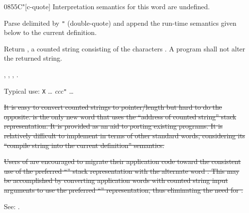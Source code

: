 \begin{worddef}[Cq]{0855}{C"}[c-quote]
\interpret
	Interpretation semantics for this word are undefined.

\compile

	Parse  delimited by \texttt{"} (double-quote) and
	append the run-time semantics given below to the current
	definition.

\runtime

	Return , a counted string consisting of the
	characters . A program shall not alter the returned
	string.

\see {},
	,
	,
	.

	\begin{rationale} %
		Typical use:
			\word{:} \texttt{X} {\ldots}
				 \emph{ccc}\texttt{"}
			{\ldots} \word{;}

\cbstart{}
\sout{%
		It is easy to convert counted strings to pointer/length but
		hard to do the opposite.  is the only new word that
		uses the ``address of counted string'' stack representation.
		It is provided as an aid to porting existing programs.
		It is relatively difficult to implement 
		in terms of other standard words, considering its ``compile
		string into the current definition'' semantics.}

\sout{%
		Users of  are encouraged to migrate their application
		code toward the consistent use of the preferred
		``}\sout{'' stack representation with the alternate
		word . This may be accomplished by converting
		application words with counted string input arguments to use
		the preferred ``}\sout{'' representation, thus
		eliminating the need for .}
\cbend

		See: .
	\end{rationale}

	\begin{testing}
		 \\
		 \\
		 \\
	\end{testing}
\end{worddef}


